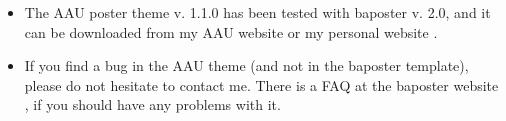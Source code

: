   \begin{itemize}
  	\item The AAU poster theme v. 1.1.0 has been tested with baposter v. 2.0, and it can be downloaded from my AAU website \cite{jknaau} or my personal website \cite{jknsqrt-1}.
  	\item If you find a bug in the AAU theme (and not in the baposter template), please do not hesitate to contact me. There is a FAQ at the baposter website \cite{baposter}, if you should have any problems with it.
  \end{itemize}
  
  
